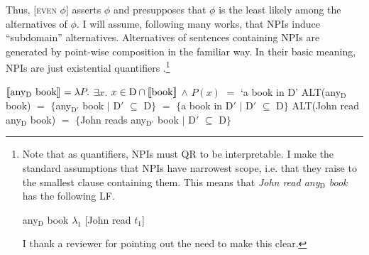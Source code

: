 \documentclass[output=paper,colorlinks,citecolor=brown]{langscibook}
\begin{document}



Thus, $[$\textsc{even} $\phi]$ asserts $\phi$ and presupposes that $\phi$ is the least likely among the alternatives of $\phi$. I will assume, following many works, that NPIs induce ``subdomain'' alternatives. Alternatives of sentences containing NPIs are generated by point-wise composition in the familiar way. In their basic meaning, NPIs are just existential quantifiers \citep{Kadmon:1993, krifka1995semantics, Chierchia:2013}.\footnote{Note that as quantifiers, NPIs must QR to be interpretable. I make the standard assumptions that NPIs have narrowest scope, i.e. that they raise to the smallest clause containing them. This means that \textit{John read any$_{\text{D}}$ book} has the following LF.

\ea
any$_{\text{D}}$ book $\lambda_1$ [John read $t_1$]
\z

I thank a reviewer for pointing out the need to make this clear.}


\ea
\ea $\llbracket \text{any$_{\text{D}}$ book}\rrbracket^{} = \lambda P.$ $\exists x$. $x \in \text{D} \cap \llbracket \text{book}\rrbracket^{}$ $\wedge$ $P(x)$ $=$ `a book in D'
\ex ALT(any$_{\text{D}}$ book) $=$ $\{$any$_\text{D$'$}$ book $|$ D$'$ $\subseteq$ D$\}$ $=$ $\{$a book in D$'$ $|$ D$'$ $\subseteq$ D$\}$
\ex ALT(John read any$_{\text{D}}$ book) $=$ $\{$John reads any$_\text{D$'$}$ book $|$ D$'$ $\subseteq$ D$\}$
\z
\z


\end{document}
